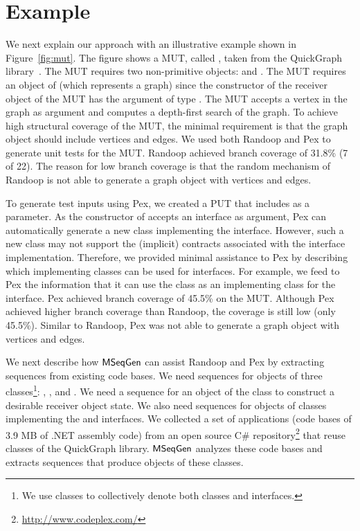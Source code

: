 \section{Example}
\label{sec:example}

We next explain our approach with an illustrative example shown in Figure~\ref{fig:mut}. The figure shows a MUT, called , taken from the QuickGraph library~\cite{QUICKGRAPH}. The MUT requires two non-primitive objects:  and . The MUT requires an object of  (which represents a graph) since the constructor of the receiver object of the MUT has the argument of type . The MUT accepts a vertex in the graph as argument and computes a depth-first search of the graph. To achieve high structural coverage of the MUT, the minimal requirement is that the graph object should include vertices and edges. We used both Randoop and Pex to generate unit tests for the MUT. Randoop achieved branch coverage of 31.8\% (7 of 22). The reason for low branch coverage is that the random mechanism of Randoop is not able to generate a graph object with vertices and edges.

To generate test inputs using Pex, we created a PUT that includes  as a parameter. As the constructor of  accepts an interface  as argument, Pex can automatically generate a new class implementing the  interface. However, such a new class may not support the (implicit) contracts associated with the interface implementation. Therefore, we provided minimal assistance to Pex by describing which implementing classes can be used for interfaces. For example, we feed to Pex the information that it can use the  class as an implementing class for the  interface. Pex achieved branch coverage of 45.5\% on the MUT. Although Pex achieved higher branch coverage than Randoop, the coverage is still low (only 45.5\%). Similar to Randoop, Pex was not able to generate a graph object with vertices and edges.

We next describe how $\textsf{MSeqGen} $ can assist Randoop and Pex by extracting sequences from existing code bases. 
We need sequences for objects of three classes\footnote{We use classes to collectively denote both classes and interfaces.}: , , and . We need a  sequence for an object of the  class to construct a desirable receiver object state. We also need sequences for objects of classes implementing the  and  interfaces. 
We collected a set of applications (code bases of 3.9 MB of .NET assembly code) from an open source C\# repository\footnote{\url{http://www.codeplex.com/}} that reuse classes of the QuickGraph library.
$\textsf{MSeqGen} $ analyzes these code bases and extracts sequences that produce objects of these classes.

